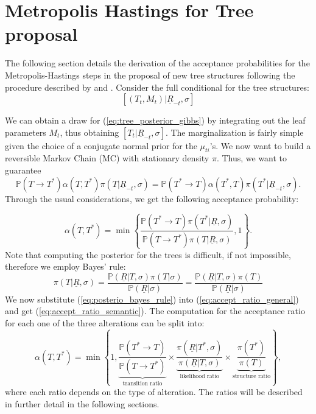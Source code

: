\documentclass[11pt,a4paper]{article}
\newcommand{\vect}[1]{\underline{#1}}
\newcommand{\prob}{\mathbb{P}}
\begin{document}
\appendix
\section{Metropolis Hastings for Tree proposal}
The following section details the derivation of the acceptance probabilities for the Metropolis-Hastings steps in the proposal of new tree structures following the procedure described by \cite{Tan_2019} and \cite{bartmachine_2014}.
Consider the full conditional for the tree structures:
\begin{equation}
    \label{eq:tree_posterior_gibbs}
    [(T_t, M_t) | \vect{R}_{-t}, \sigma]
\end{equation}

We can obtain a draw for (\ref{eq:tree_posterior_gibbs}) by integrating out the leaf parameters $M_t$, thus obtaining $[T_t | \vect{R}_{-t}, \sigma]$. The marginalization is fairly simple given the choice of a conjugate normal prior for the $\mu_{ti}$'s.
We now want to build a reversible Markov Chain (MC) with stationary density $\pi$. Thus, we want to guarantee
\begin{equation}
    \label{eq:reversibility_guarantee}
    \prob(T\to T^*) \alpha(T, T^*) \pi(T | \vect{R}_{-t}, \sigma) = \prob(T^*\to T) \alpha(T^*, T) \pi(T^* | \vect{R}_{-t}, \sigma).
\end{equation}
Through the usual considerations, we get the following acceptance probability:

\begin{equation}
    \label{eq:accept_ratio_general}
    \alpha(T, T^*) = \min \left\{ \frac{\prob(T^* \to T) \pi(T^* | \vect{R}, \sigma)}{\prob(T \to T^*) \pi(T | \vect{R}, \sigma)}, 1 \right\}.
\end{equation}
Note that computing the posterior for the trees is difficult, if not impossible, therefore we employ Bayes' rule:
\begin{equation}
    \label{eq:posterio_bayes_rule}
    \pi(T | \vect{R}, \sigma) = \frac{\prob(\vect{R} | T, \sigma) \pi(T | \sigma)}{\prob(\vect{R} | \sigma)} = \frac{\prob(\vect{R} | T, \sigma) \pi(T)}{\prob(\vect{R} | \sigma)}
\end{equation}
We now substitute (\ref{eq:posterio_bayes_rule}) into (\ref{eq:accept_ratio_general}) and get (\ref{eq:accept_ratio_semantic}).
The computation for the acceptance ratio for each one of the three alterations can be split into:
\begin{equation}
    \label{eq:accept_ratio_semantic}
    \alpha(T, T^*) = \min\left\{1, \underbrace{\frac{\prob(T^* \to T)}{\prob(T \to T^*)}}_{\text{transition ratio}} \times \underbrace{\frac{\pi(\vect{R} | T^*, \sigma)}{\pi(\vect{R} | T, \sigma)}}_{\text{likelihood ratio}} \times \underbrace{\frac{\pi(T^*)}{\pi(T)}}_{\text{structure ratio}}\right\},
\end{equation}
where each ratio depends on the type of alteration. The ratios will be described in further detail in the following sections.
\end{document}

